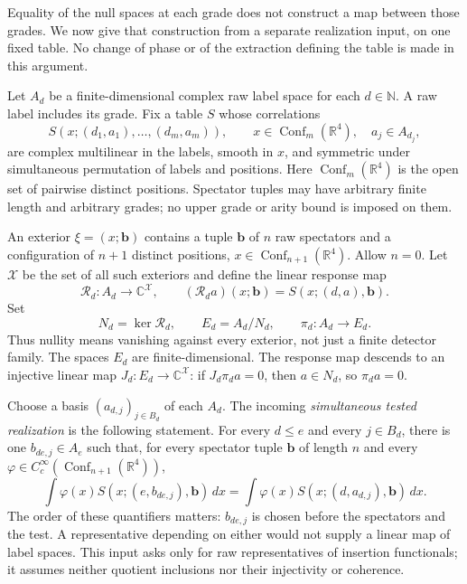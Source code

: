 Equality of the null spaces at each grade does not construct a map between
those grades. We now give that construction from a separate realization
input, on one fixed table. No change of phase or of the extraction defining
the table is made in this argument.

Let $A_d$ be a finite-dimensional complex raw label space for each
$d\in\mathbb N$. A raw label includes its grade. Fix a table $S$ whose
correlations
\[
 S(x;(d_1,a_1),\ldots,(d_m,a_m)),\qquad
 x\in\operatorname{Conf}_m(\mathbb R^4),\quad a_j\in A_{d_j},
\]
are complex multilinear in the labels, smooth in $x$, and symmetric under
simultaneous permutation of labels and positions. Here
$\operatorname{Conf}_m(\mathbb R^4)$ is the open set of pairwise distinct
positions. Spectator tuples may have arbitrary finite length and arbitrary
grades; no upper grade or arity bound is imposed on them.

An exterior $\xi=(x;\boldsymbol b)$ contains a tuple $\boldsymbol b$
of $n$ raw spectators and a configuration of $n+1$ distinct positions,
$x\in\operatorname{Conf}_{n+1}(\mathbb R^4)$. Allow $n=0$. Let $\mathcal X$ be the set of all such exteriors and define the
linear response map
\[
 \mathcal R_d:A_d\longrightarrow\mathbb C^{\mathcal X},\qquad
 (\mathcal R_da)(x;\boldsymbol b)=S(x;(d,a),\boldsymbol b).
\]
Set
\[
 N_d=\ker\mathcal R_d,\qquad E_d=A_d/N_d,
 \qquad \pi_d:A_d\longrightarrow E_d.
\]
Thus nullity means vanishing against every exterior, not just a finite
detector family. The spaces $E_d$ are finite-dimensional. The response map
descends to an injective linear map
$J_d:E_d\to\mathbb C^{\mathcal X}$: if $J_d\pi_da=0$, then
$a\in N_d$, so $\pi_da=0$.

Choose a basis $(a_{d,j})_{j\in B_d}$ of each $A_d$. The incoming
\emph{simultaneous tested realization} is the following statement. For
every $d\le e$ and every $j\in B_d$, there is one $b_{de,j}\in A_e$
such that, for every spectator tuple $\boldsymbol b$ of length $n$ and
every $\varphi\in C_c^\infty(\operatorname{Conf}_{n+1}(\mathbb R^4))$,
\begin{equation}\label{eq:phase-inclusion-tested-input}
 \int\varphi(x)S(x;(e,b_{de,j}),\boldsymbol b)\,dx
 =\int\varphi(x)S(x;(d,a_{d,j}),\boldsymbol b)\,dx.
\end{equation}
The order of these quantifiers matters: $b_{de,j}$ is chosen before the
spectators and the test. A representative depending on either would not
supply a linear map of label spaces. This input asks only for raw
representatives of insertion functionals; it assumes neither quotient
inclusions nor their injectivity or coherence.

